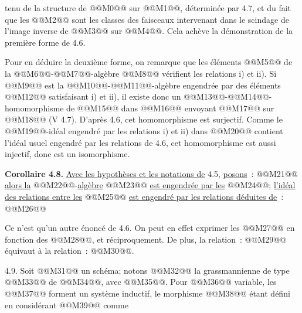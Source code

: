 
tenu de la structure de @@M0@@ sur @@M1@@, déterminée par 4.7, et du fait que les @@M2@@ sont les classes des faisceaux intervenant dans le scindage de l'image inverse de @@M3@@ sur @@M4@@. Cela achève la démonstration de la première forme de 4.6.

Pour en déduire la deuxième forme, on remarque que les éléments @@M5@@ de la @@M6@@-@@M7@@-algèbre @@M8@@ vérifient les relations i) et ii). Si @@M9@@ est la @@M10@@-@@M11@@-algèbre engendrée par des éléments @@M12@@ satisfaisant i) et ii), il existe donc un @@M13@@-@@M14@@-homomorphisme de @@M15@@ dans @@M16@@ envoyant @@M17@@ sur @@M18@@ (V 4.7). D'après 4.6, cet homomorphisme est surjectif. Comme le @@M19@@-idéal engendré par les relations i) et ii) dans @@M20@@ contient l'idéal usuel engendré par les relations de 4.6, cet homomorphisme est aussi injectif, donc est un isomorphisme.

\textbf{Corollaire 4.8.} \uline{Avec les hypothèses et les notations de} 4.5, \uline{posons}~:
@@M21@@
\uline{alors la} @@M22@@-\uline{algèbre} @@M23@@ \uline{est engendrée par les} @@M24@@; \uline{l'idéal des relations entre les} @@M25@@ \uline{est engendré par les relations déduites de}~:
@@M26@@

Ce n'est qu'un autre énoncé de 4.6. On peut en effet exprimer les @@M27@@ en fonction des @@M28@@, et réciproquement. De plus, la relation~: @@M29@@ équivaut à la relation~: @@M30@@.

4.9.
Soit @@M31@@ un schéma; notons @@M32@@ la grassmannienne de type @@M33@@ de @@M34@@, avec @@M35@@. Pour @@M36@@ variable, les @@M37@@ forment un système inductif, le morphisme @@M38@@ étant défini en considérant @@M39@@ comme
